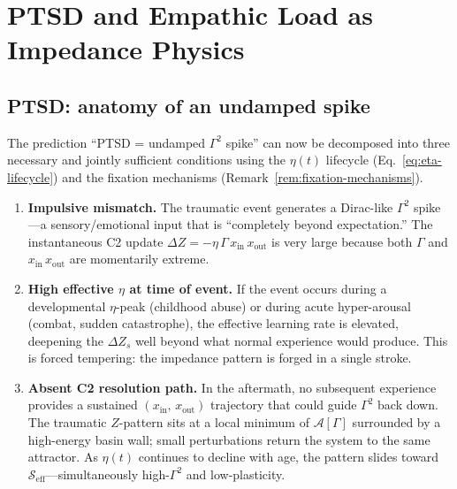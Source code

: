 \documentclass[aps,pre,twocolumn,superscriptaddress,floatfix]{revtex4-2}
\begin{document}
\section{PTSD and Empathic Load as Impedance Physics}
\label{sec:ptsd}

\subsection{PTSD: anatomy of an undamped spike}
\label{sec:ptsd-anatomy}

The prediction ``PTSD = undamped $\Gamma^2$ spike''
can now be decomposed
into three necessary and jointly sufficient conditions
using the $\eta(t)$ lifecycle (Eq.~\ref{eq:eta-lifecycle})
and the fixation mechanisms (Remark~\ref{rem:fixation-mechanisms}).

\begin{enumerate}
  \item \textbf{Impulsive mismatch.}
    The traumatic event generates a Dirac-like $\Gamma^2$
    spike---a sensory/emotional input that is ``completely
    beyond expectation.''
    The instantaneous C2 update
    $\Delta Z = -\eta\,\Gamma\,x_{\text{in}}\,x_{\text{out}}$
    is very large because both $\Gamma$ and
    $x_{\text{in}}\,x_{\text{out}}$ are momentarily extreme.
  \item \textbf{High effective $\eta$ at time of event.}
    If the event occurs during a developmental $\eta$-peak
    (childhood abuse) or during acute hyper-arousal
    (combat, sudden catastrophe), the effective learning
    rate is elevated, deepening the $\Delta Z_s$ well
    beyond what normal experience would produce.
    This is forced tempering: the impedance pattern is
    forged in a single stroke.
  \item \textbf{Absent C2 resolution path.}
    In the aftermath, no subsequent experience provides
    a sustained $(x_{\text{in}},\,x_{\text{out}})$
    trajectory that could guide $\Gamma^2$ back down.
    The traumatic $Z$-pattern sits at a local minimum
    of $\mathcal{A}[\Gamma]$ surrounded by a high-energy
    basin wall; small perturbations return the system
    to the same attractor.
    As $\eta(t)$ continues to decline with age, the
    pattern slides toward
    $\mathcal{S}_{\text{eff}}$---simultaneously
    high-$\Gamma^2$ and low-plasticity.
\end{enumerate}
\end{document}
